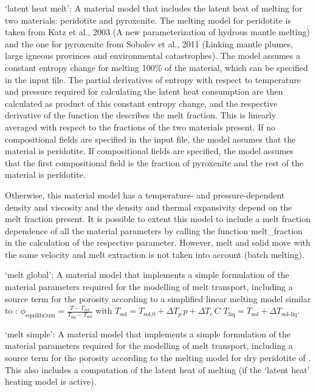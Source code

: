 \begin{itemize}
`latent heat melt': A material model that includes the latent heat of melting for two materials: peridotite and pyroxenite. The melting model for peridotite is taken from Katz et al., 2003 (A new parameterization of hydrous mantle melting) and the one for pyroxenite from Sobolev et al., 2011 (Linking mantle plumes, large igneous provinces and environmental catastrophes). The model assumes a constant entropy change for melting 100\% of the material, which can be specified in the input file. The partial derivatives of entropy with respect to temperature and pressure required for calculating the latent heat consumption are then calculated as product of this constant entropy change, and the respective derivative of the function the describes the melt fraction. This is linearly averaged with respect to the fractions of the two materials present. If no compositional fields are specified in the input file, the model assumes that the material is peridotite. If compositional fields are specified, the model assumes that the first compositional field is the fraction of pyroxenite and the rest of the material is peridotite. 

Otherwise, this material model has a temperature- and pressure-dependent density and viscosity and the density and thermal expansivity depend on the melt fraction present. It is possible to extent this model to include a melt fraction dependence of all the material parameters by calling the function melt\_fraction in the calculation of the respective parameter. However, melt and solid move with the same velocity and melt extraction is not taken into account (batch melting). 

`melt global': A material model that implements a simple formulation of the material parameters required for the modelling of melt transport, including a source term for the porosity according to a simplified linear melting model similar to \cite{schmeling2006}:
$\phi_\text{equilibrium} = \frac{T-T_\text{sol}}{T_\text{liq}-T_\text{sol}}$
with $T_\text{sol} = T_\text{sol,0} + \Delta T_p \, p + \Delta T_c \, C$ 
$T_\text{liq} = T_\text{sol}  + \Delta T_\text{sol-liq}$.

`melt simple': A material model that implements a simple formulation of the material parameters required for the modelling of melt transport, including a source term for the porosity according to the melting model for dry peridotite of \cite{KSL2003}. This also includes a computation of the latent heat of melting (if the `latent heat' heating model is active).


\end{itemize}
